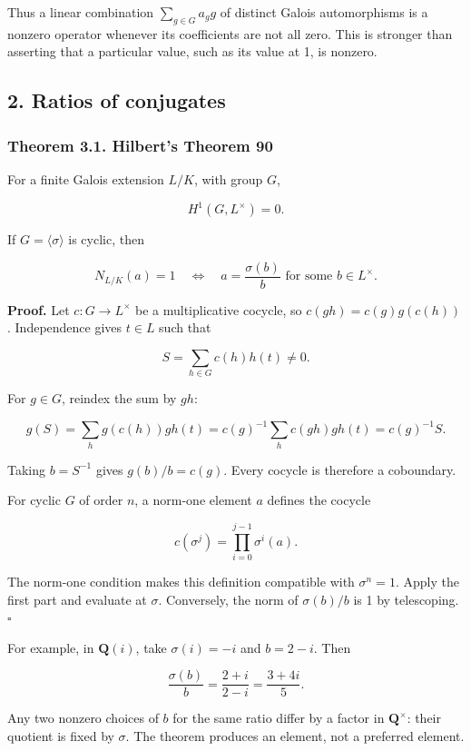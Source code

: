 \documentclass[11pt,a4paper]{article}
\begin{document}
Thus a linear combination \(\sum_{g\in G}a_g g\) of distinct Galois
automorphisms is a nonzero operator whenever its coefficients are not
all zero. This is stronger than asserting that a particular value, such
as its value at 1, is nonzero.

\subsection{2. Ratios of conjugates}\label{ratios-of-conjugates}

\subsubsection{Theorem 3.1. Hilbert's Theorem
90}\label{theorem-3.1.-hilberts-theorem-90}

For a finite Galois extension \(L/K\), with group \(G\),

\[
H^1(G,L^\times)=0.
\]

If \(G=\langle\sigma\rangle\) is cyclic, then

\[
N_{L/K}(a)=1
\quad\Longleftrightarrow\quad
a=\frac{\sigma(b)}b\text{ for some }b\in L^\times.
\]

\textbf{Proof.} Let \(c:G\to L^\times\) be a multiplicative cocycle, so
\(c(gh)=c(g)g(c(h))\). Independence gives \(t\in L\) such that

\[
S=\sum_{h\in G}c(h)h(t)\ne0.
\]

For \(g\in G\), reindex the sum by \(gh\):

\[
g(S)=\sum_h g(c(h))gh(t)
=c(g)^{-1}\sum_h c(gh)gh(t)
=c(g)^{-1}S.
\]

Taking \(b=S^{-1}\) gives \(g(b)/b=c(g)\). Every cocycle is therefore a
coboundary.

For cyclic \(G\) of order \(n\), a norm-one element \(a\) defines the
cocycle

\[
c(\sigma^j)=\prod_{i=0}^{j-1}\sigma^i(a).
\]

The norm-one condition makes this definition compatible with
\(\sigma^n=1\). Apply the first part and evaluate at \(\sigma\).
Conversely, the norm of \(\sigma(b)/b\) is 1 by telescoping. \(\square\)

For example, in \(\mathbf Q(i)\), take \(\sigma(i)=-i\) and \(b=2-i\).
Then

\[
\frac{\sigma(b)}b=\frac{2+i}{2-i}=\frac{3+4i}{5}.
\]

Any two nonzero choices of \(b\) for the same ratio differ by a factor
in \(\mathbf Q^\times\): their quotient is fixed by \(\sigma\). The
theorem produces an element, not a preferred element.
\end{document}
